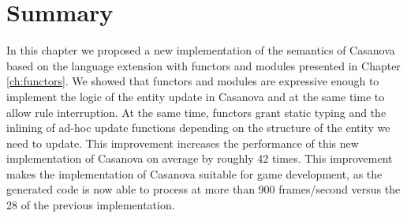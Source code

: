 \section{Summary}
In this chapter we proposed a new implementation of the semantics of Casanova based on the language extension with functors and modules presented in Chapter \ref{ch:functors}. We showed that functors and modules are expressive enough to implement the logic of the entity update in Casanova and at the same time to allow rule interruption. At the same time, functors grant static typing and the inlining of ad-hoc update functions depending on the structure of the entity we need to update. This improvement increases the performance of this new implementation of Casanova on average by roughly 42 times. This improvement makes the implementation of Casanova suitable for game development, as the generated code is now able to process at more than 900 frames/second versus the 28 of the previous implementation.

